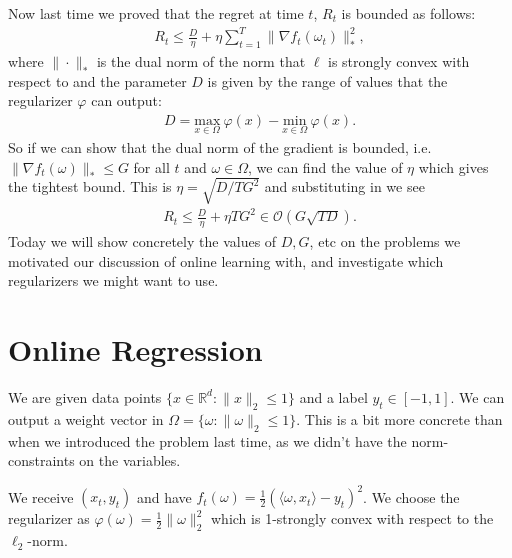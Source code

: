 \documentclass[11pt]{article}
\begin{document}
Now last time we proved that the regret at time \(t\), \(R_t\) is bounded as follows:
\begin{align}
    R_t \leq \frac{D}{\eta} + \eta \sum_{t=1}^T\|\nabla f_t(\omega_t)\|_*^2,
\end{align}
where \(\|\cdot\|_*\) is the dual norm of the norm that \(\ell\) is strongly convex with respect to and the parameter \(D\) is given by the range of values that the regularizer \(\varphi\) can output:
\begin{align}
    D = \underset{x\in \Omega}{\mathrm{max}} \ \varphi(x) - \underset{x\in \Omega}{\mathrm{min}}\ \varphi(x).
\end{align}
So if we can show that the dual norm of the gradient is bounded, i.e. \(\| \nabla f_t (\omega)\|_* \leq G\) for all \(t\) and \(\omega \in \Omega\), we can find the value of \(\eta\) which gives the tightest bound. This is \(\eta = \sqrt{D/TG^2}\) and substituting in we see
\begin{align}
\label{eq:rate}
    R_t \leq \frac{D}{\eta} + \eta TG^2 \in  \mathcal{O}\left(G\sqrt{TD}\right).
\end{align}
Today we will show concretely the values of \(D,G\), etc on the problems we motivated our discussion of online learning with, and investigate which regularizers we might want to use.

\section{Online Regression}
We are given data points \(\{x \in \mathbb{R}^d: \|x\|_2 \leq 1\}\) and a label \(y_t \in [-1, 1]\). We can output a weight vector in \(\Omega = \{\omega : \|\omega\|_2 \leq 1\}\). This is a bit more concrete than when we introduced the problem last time, as we didn't have the norm-constraints on the variables. 

We receive \((x_t, y_t)\) and have \(f_t(\omega) = \tfrac{1}{2}(\langle \omega, x_t \rangle - y_t)^2\). We choose the regularizer as \(\varphi(\omega)=\tfrac{1}{2}\|\omega\|_2^2\) which is 1-strongly convex with respect to the \(\ell_2\)-norm. 
\end{document}
